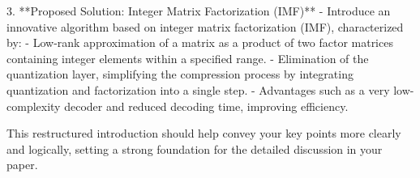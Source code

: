 3. **Proposed Solution: Integer Matrix Factorization (IMF)**
- Introduce an innovative algorithm based on integer matrix factorization (IMF), characterized by:
- Low-rank approximation of a matrix as a product of two factor matrices containing integer elements within a specified range.
- Elimination of the quantization layer, simplifying the compression process by integrating quantization and factorization into a single step.
- Advantages such as a very low-complexity decoder and reduced decoding time, improving efficiency.

This restructured introduction should help convey your key points more clearly and logically, setting a strong foundation for the detailed discussion in your paper.